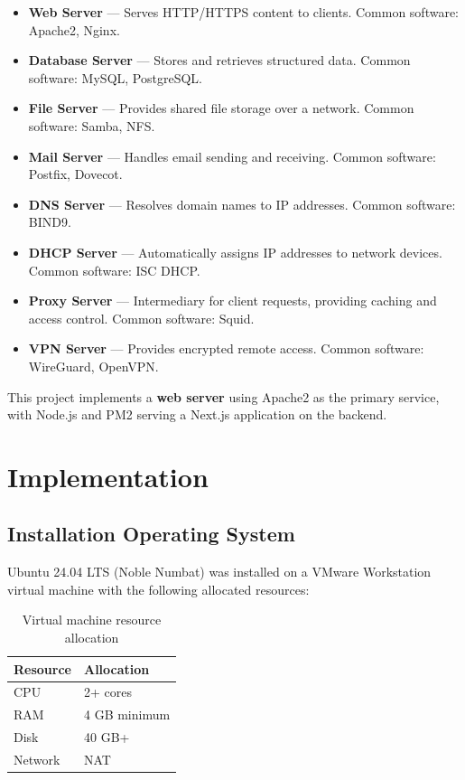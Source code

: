 \documentclass[12pt,a4paper]{report}
\begin{document}
\begin{itemize}[leftmargin=2em]
    \item \textbf{Web Server} --- Serves HTTP/HTTPS content to clients. Common software: Apache2, Nginx.
    \item \textbf{Database Server} --- Stores and retrieves structured data. Common software: MySQL, PostgreSQL.
    \item \textbf{File Server} --- Provides shared file storage over a network. Common software: Samba, NFS.
    \item \textbf{Mail Server} --- Handles email sending and receiving. Common software: Postfix, Dovecot.
    \item \textbf{DNS Server} --- Resolves domain names to IP addresses. Common software: BIND9.
    \item \textbf{DHCP Server} --- Automatically assigns IP addresses to network devices. Common software: ISC DHCP.
    \item \textbf{Proxy Server} --- Intermediary for client requests, providing caching and access control. Common software: Squid.
    \item \textbf{VPN Server} --- Provides encrypted remote access. Common software: WireGuard, OpenVPN.
\end{itemize}

This project implements a \textbf{web server} using Apache2 as the primary service, with Node.js and PM2 serving a Next.js application on the backend.

\newpage

\chapter{Implementation}

\section{Installation Operating System}

\indent Ubuntu 24.04 LTS (Noble Numbat) was installed on a VMware Workstation virtual machine with the following allocated resources:

\begin{table}[H]
\centering
\begin{tabular}{l l}
\toprule
\textbf{Resource} & \textbf{Allocation} \\
\midrule
CPU    & 2+ cores \\
RAM    & 4 GB minimum\\
Disk   & 40 GB+\\
Network & NAT \\
\bottomrule
\end{tabular}
\caption{Virtual machine resource allocation}
\end{table}
\end{document}
